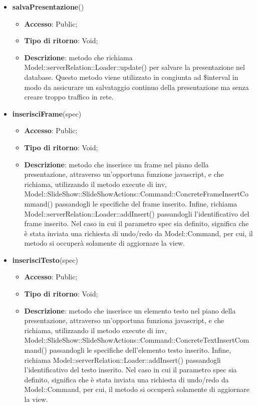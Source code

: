{{\begin{itemize}
\begin{itemize}
		\end{itemize}
		\item \textbf{salvaPresentazione}()
		\begin{itemize}
			\item \textbf{Accesso}: Public;
			\item \textbf{Tipo di ritorno}: Void;
			\item \textbf{Descrizione}: metodo che richiama Model::\-serverRelation::\-Loader::\-update() per salvare la presentazione nel database. Questo metodo viene utilizzato in congiunta ad \$interval in modo da assicurare un salvataggio continuo della presentazione ma senza creare troppo traffico in rete.
		\end{itemize}
		\item \textbf{inserisciFrame}(spec)
		\begin{itemize}
			\item \textbf{Accesso}: Public;
			\item \textbf{Tipo di ritorno}: Void;
			\item \textbf{Descrizione}: metodo che inserisce un frame nel piano della presentazione, attraverso un'opportuna funzione javascript, e che richiama, utilizzando il metodo execute di inv, Model::\-SlideShow::\-SlideShowActions::\-Command::\-ConcreteFrameInsertCommand() passandogli le specifiche del frame inserito. Infine, richiama Model::\-serverRelation::\-Loader::\-addInsert() passandogli l'identificativo del frame inserito. Nel caso in cui il parametro spec sia definito, significa che è stata inviata una richiesta di undo/redo da Model::\-Command, per cui, il metodo si occuperà solamente di aggiornare la view.
		\end{itemize}
		\item \textbf{inserisciTesto}(spec)
		\begin{itemize}
			\item \textbf{Accesso}: Public;
			\item \textbf{Tipo di ritorno}: Void;
			\item \textbf{Descrizione}: metodo che inserisce un elemento testo nel piano della presentazione, attraverso un'opportuna funziona javascript, e che richiama, utilizzando il metodo execute di inv, Model::\-SlideShow::\-SlideShowActions::\-Command::\-ConcreteTextInsertCommand() passandogli le specifiche dell'elemento testo inserito. Infine, richiama Model::\-serverRelation::\-Loader::\-addInsert() passandogli l'identificativo del testo inserito. Nel caso in cui il parametro spec sia definito, significa che è stata inviata una richiesta di undo/redo da Model::\-Command, per cui, il metodo si occuperà solamente di aggiornare la view.

\end{itemize}
\end{itemize}}}
